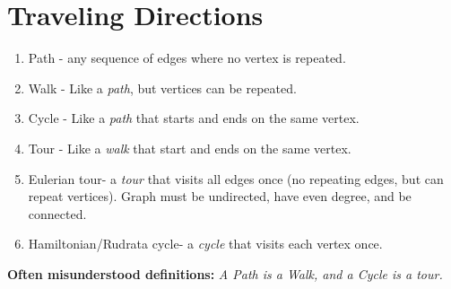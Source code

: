 \documentclass[a4paper]{article}
\begin{document}
\section{Traveling Directions}

\begin{enumerate}
	\item Path - any sequence of edges where no vertex is repeated.
	\item Walk - Like a \textit{path}, but vertices can be repeated.
	\item Cycle - Like a \textit{path} that starts and ends on the same vertex.
	\item Tour - Like a \textit{walk} that start and ends on the same vertex.
	\item Eulerian tour- a \textit{tour} that visits all edges once (no repeating edges, but can repeat vertices). Graph must be undirected, have even degree, and be connected. 
	\item Hamiltonian/Rudrata cycle- a \textit{cycle} that visits each vertex once.
\end{enumerate}

\textbf{Often misunderstood definitions:} \textit{A Path is a Walk, and a Cycle is a tour.}
\end{document}
